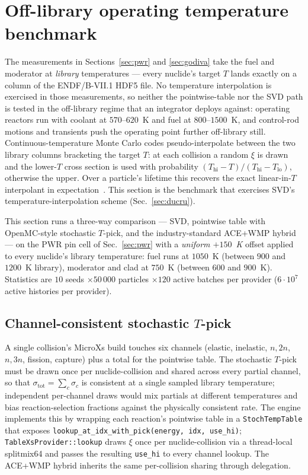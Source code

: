 \section{Off-library operating temperature benchmark}
\label{sec:off_library}

The measurements in Sections~\ref{sec:pwr} and
\ref{sec:godiva} take the fuel and moderator at \emph{library}
temperatures --- every nuclide's target $T$ lands exactly on
a column of the ENDF/B-VII.1 HDF5 file. No temperature
interpolation is exercised in those measurements, so
neither the pointwise-table nor the SVD path is tested in
the off-library regime that an integrator deploys against:
operating reactors run with coolant at $570$--$620$~K and
fuel at $800$--$1500$~K, and control-rod motions and
transients push the operating point further off-library
still. Continuous-temperature Monte Carlo codes
pseudo-interpolate between the two library columns
bracketing the target $T$: at each collision a random
$\xi$ is drawn and the lower-$T$ cross section is used
with probability
$(T_\text{hi} - T)/(T_\text{hi} - T_\text{lo})$, otherwise
the upper. Over a particle's lifetime this recovers the
exact linear-in-$T$ interpolant in
expectation~\cite{romano2015openmc}. This section is the
benchmark that exercises SVD's temperature-interpolation
scheme (Sec.~\ref{sec:ducru}).

This section runs a three-way comparison --- SVD, pointwise
table with OpenMC-style stochastic $T$-pick, and the
industry-standard ACE+WMP hybrid~\cite{josey2015wmp} --- on
the PWR pin cell of Sec.~\ref{sec:pwr} with a
\emph{uniform $+150$~K} offset applied to every nuclide's
library temperature: fuel runs at $1050$~K (between $900$
and $1200$~K library), moderator and clad at $750$~K
(between $600$ and $900$~K). Statistics are $10$ seeds
$\times 50\,000$ particles $\times 120$ active batches per
provider ($6 \cdot 10^7$ active histories per provider).

\subsection{Channel-consistent stochastic \texorpdfstring{$T$}{T}-pick}
\label{sec:off_library_bug}

A single collision's MicroXs build touches six channels
(elastic, inelastic, $n,2n$, $n,3n$, fission, capture) plus
a total for the pointwise table. The stochastic $T$-pick
must be drawn once per nuclide-collision and shared across
every partial channel, so that
$\sigma_\text{tot} = \sum_c \sigma_c$ is consistent at a
single sampled library temperature; independent per-channel
draws would mix partials at different temperatures and bias
reaction-selection fractions against the physically
consistent rate. The engine implements this by wrapping
each reaction's pointwise table in a
\texttt{StochTempTable} that exposes
\texttt{lookup\_at\_idx\_with\_pick(energy, idx, use\_hi)};
\texttt{TableXsProvider::lookup} draws $\xi$ once per
nuclide-collision via a thread-local splitmix64 and passes
the resulting \texttt{use\_hi} to every channel lookup. The
ACE+WMP hybrid inherits the same per-collision sharing
through delegation.

